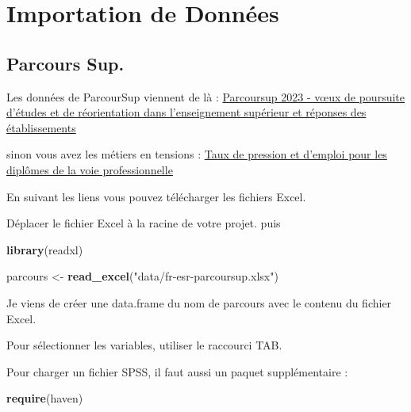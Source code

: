 \documentclass[
]{book}
\newenvironment{Shaded}{\begin{snugshade}}{\end{snugshade}}
\newcommand{\FunctionTok}[1]{\textcolor[rgb]{0.13,0.29,0.53}{\textbf{#1}}}
\newcommand{\NormalTok}[1]{#1}
\newcommand{\OtherTok}[1]{\textcolor[rgb]{0.56,0.35,0.01}{#1}}
\newcommand{\StringTok}[1]{\textcolor[rgb]{0.31,0.60,0.02}{#1}}
\begin{document}
\hypertarget{importation-de-donnuxe9es}{%
\chapter{Importation de Données}\label{importation-de-donnuxe9es}}

\hypertarget{parcours-sup.}{%
\section{Parcours Sup.}\label{parcours-sup.}}

Les données de ParcourSup viennent de là :
\href{https://data.education.gouv.fr/explore/embed/dataset/fr-esr-parcoursup/table/?sort=tri}{Parcoursup 2023 - vœux de poursuite d'études et de réorientation dans l'enseignement supérieur et réponses des établissements}

sinon vous avez les métiers en tensions :
\href{https://data.education.gouv.fr/explore/embed/dataset/fr-en-taux-de-pression-et-demploi/table/?disjunctive.diplome\&disjunctive.type_dip_lib\&disjunctive.filiere\&disjunctive.specialite_lib}{Taux de pression et d'emploi pour les diplômes de la voie professionnelle}

En suivant les liens vous pouvez télécharger les fichiers Excel.

Déplacer le fichier Excel à la racine de votre projet. puis

\begin{Shaded}
\begin{Highlighting}[]
\FunctionTok{library}\NormalTok{(readxl)}
\end{Highlighting}
\end{Shaded}

\begin{Shaded}
\begin{Highlighting}[]
\NormalTok{parcours }\OtherTok{\textless{}{-}} \FunctionTok{read\_excel}\NormalTok{(}\StringTok{"data/fr{-}esr{-}parcoursup.xlsx"}\NormalTok{)}
\end{Highlighting}
\end{Shaded}

Je viens de créer une data.frame du nom de parcours avec le contenu du fichier
Excel.

Pour sélectionner les variables, utiliser le raccourci TAB.

Pour charger un fichier SPSS, il faut aussi un paquet supplémentaire :

\begin{Shaded}
\begin{Highlighting}[]
\FunctionTok{require}\NormalTok{(haven)}
\end{Highlighting}
\end{Shaded}
\end{document}

